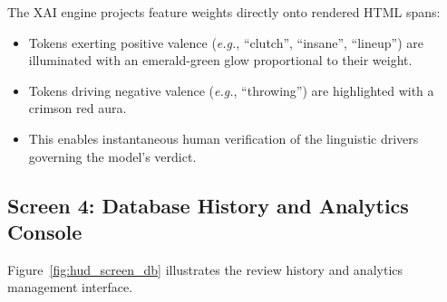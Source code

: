The XAI engine projects feature weights directly onto rendered HTML spans:
\begin{itemize}
    \item Tokens exerting positive valence (\textit{e.g.}, ``clutch'', ``insane'', ``lineup'') are illuminated with an emerald-green glow proportional to their weight.
    \item Tokens driving negative valence (\textit{e.g.}, ``throwing'') are highlighted with a crimson red aura.
    \item This enables instantaneous human verification of the linguistic drivers governing the model's verdict.
\end{itemize}

\subsection{Screen 4: Database History and Analytics Console}
Figure~\ref{fig:hud_screen_db} illustrates the review history and analytics management interface.

